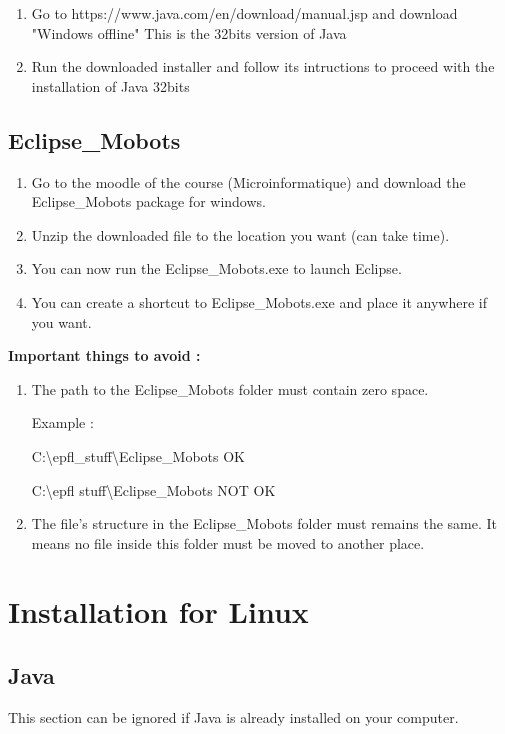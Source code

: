\documentclass[a4paper]{article}
\begin{document}
\begin{enumerate}
\item Go to https://www.java.com/en/download/manual.jsp and download "Windows offline" This is the 32bits version of Java
\item Run the downloaded installer and follow its intructions to proceed with the installation of Java 32bits
\end{enumerate}


\subsection{Eclipse\_Mobots}

\begin{enumerate}
\item Go to the moodle of the course (Microinformatique) and download the Eclipse\_Mobots package for windows.
\item Unzip the downloaded file to the location you want (can take time). 
\item You can now run the Eclipse\_Mobots.exe to launch Eclipse.
\item You can create a shortcut to Eclipse\_Mobots.exe and place it anywhere if you want.
\end{enumerate}

\textbf{Important things to avoid :}

\begin{enumerate}
\item The path to the Eclipse\_Mobots folder must contain zero space. 

Example :

C:\textbackslash epfl\_stuff\textbackslash Eclipse\_Mobots   OK

C:\textbackslash epfl stuff\textbackslash Eclipse\_Mobots   NOT OK
\item The file's structure in the Eclipse\_Mobots folder must remains the same. It means no file inside this folder must be moved to another place.
\end{enumerate}

\newpage
\section{Installation for Linux}

\subsection{Java}
This section can be ignored if Java is already installed on your computer.
\end{document}
